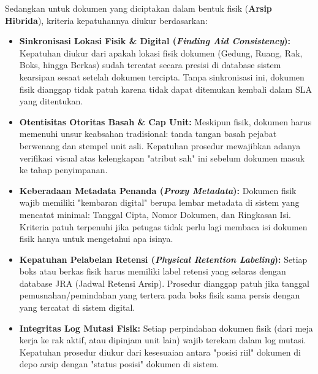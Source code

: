 \documentclass[12pt,a4paper]{report}
\begin{document}
Sedangkan untuk dokumen yang diciptakan dalam bentuk fisik (\textbf{Arsip Hibrida}), kriteria kepatuhannya diukur berdasarkan:
\begin{itemize}[leftmargin=*]
    \item \textbf{Sinkronisasi Lokasi Fisik \& Digital (\textit{Finding Aid Consistency}):} Kepatuhan diukur dari apakah lokasi fisik dokumen (Gedung, Ruang, Rak, Boks, hingga Berkas) sudah tercatat secara presisi di database sistem kearsipan sesaat setelah dokumen tercipta. Tanpa sinkronisasi ini, dokumen fisik dianggap tidak patuh karena tidak dapat ditemukan kembali dalam SLA yang ditentukan.
    \item \textbf{Otentisitas Otoritas Basah \& Cap Unit:} Meskipun fisik, dokumen harus memenuhi unsur keabsahan tradisional: tanda tangan basah pejabat berwenang dan stempel unit asli. Kepatuhan prosedur mewajibkan adanya verifikasi visual atas kelengkapan "atribut sah" ini sebelum dokumen masuk ke tahap penyimpanan.
    \item \textbf{Keberadaan Metadata Penanda (\textit{Proxy Metadata}):} Dokumen fisik wajib memiliki "kembaran digital" berupa lembar metadata di sistem yang mencatat minimal: Tanggal Cipta, Nomor Dokumen, dan Ringkasan Isi. Kriteria patuh terpenuhi jika petugas tidak perlu lagi membaca isi dokumen fisik hanya untuk mengetahui apa isinya.
    \item \textbf{Kepatuhan Pelabelan Retensi (\textit{Physical Retention Labeling}):} Setiap boks atau berkas fisik harus memiliki label retensi yang selaras dengan database JRA (Jadwal Retensi Arsip). Prosedur dianggap patuh jika tanggal pemusnahan/pemindahan yang tertera pada boks fisik sama persis dengan yang tercatat di sistem digital.
    \item \textbf{Integritas Log Mutasi Fisik:} Setiap perpindahan dokumen fisik (dari meja kerja ke rak aktif, atau dipinjam unit lain) wajib terekam dalam log mutasi. Kepatuhan prosedur diukur dari kesesuaian antara "posisi riil" dokumen di depo arsip dengan "status posisi" dokumen di sistem.
\end{itemize}
\end{document}
